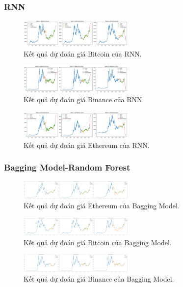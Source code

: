 \documentclass[conference]{IEEEtran}
\begin{document}
\subsubsection{RNN}
\begin{figure}[H]
    \centering
    \includegraphics[width=0.5\textwidth]{bibliography/pictures/RNNbtc.png}
    \caption{Kết quả dự đoán giá Bitcoin của RNN.}
\end{figure}
\begin{figure}[H]
    \centering
    \includegraphics[width=0.5\textwidth]{bibliography/pictures/RNNbnb.png}
    \caption{Kết quả dự đoán giá Binance của RNN.}
\end{figure}
\begin{figure}[H]
    \centering
    \includegraphics[width=0.5\textwidth]{bibliography/pictures/RNNeth.png}
    \caption{Kết quả dự đoán giá Ethereum của RNN.}
\end{figure}

\subsubsection{Bagging Model-Random Forest}
\begin{figure}[H]
    \centering
    \includegraphics[width=0.5\textwidth]{bibliography/pictures/Bagging_ETH.png}
    \caption{Kết quả dự đoán giá Ethereum của Bagging Model.}
\end{figure}
\begin{figure}[H]
    \centering
    \includegraphics[width=0.5\textwidth]{bibliography/pictures/Bagging_BTC.png}
    \caption{Kết quả dự đoán giá Bitcoin của Bagging Model.}
\end{figure}
\begin{figure}[H]
    \centering
    \includegraphics[width=0.5\textwidth]{bibliography/pictures/Bagging_BNB.png}
    \caption{Kết quả dự đoán giá Binance của Bagging Model.}
\end{figure}
\end{document}

